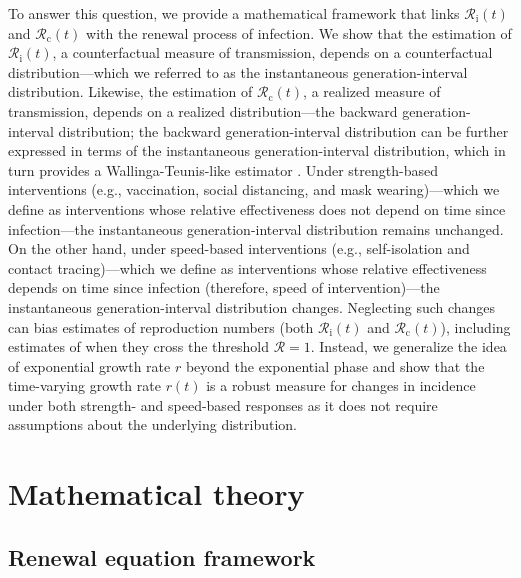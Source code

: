 \documentclass[12pt]{article}
\newcommand{\Rx}[1]{\ensuremath{{\mathcal R}_{#1}}\xspace}
\newcommand{\Rc}{\Rx{\mathrm{c}}}
\newcommand{\Ri}{\Rx{\mathrm{i}}}
\newcommand{\RR}{\ensuremath{{\mathcal R}}\xspace}
\begin{document}
To answer this question, we provide a mathematical framework that links $\Ri(t)$ and $\Rc(t)$ with the renewal process of infection.
We show that the estimation of $\Ri(t)$, a counterfactual measure of transmission, depends on a counterfactual distribution---which we referred to as the instantaneous generation-interval distribution.
Likewise, the estimation of $\Rc(t)$, a realized measure of transmission, depends on a realized distribution---the backward generation-interval distribution;
the backward generation-interval distribution can be further expressed in terms of the instantaneous generation-interval distribution, which in turn provides a Wallinga-Teunis-like estimator \citep{wallinga2004different}.
Under strength-based interventions (e.g., vaccination, social distancing, and mask wearing)---which we define as interventions whose relative effectiveness does not depend on time since infection---the instantaneous generation-interval distribution remains unchanged.
On the other hand, under speed-based interventions (e.g., self-isolation and contact tracing)---which we define as interventions whose relative effectiveness depends on time since infection (therefore, speed of intervention)---the instantaneous generation-interval distribution changes.
Neglecting such changes can bias estimates of reproduction numbers (both $\Ri(t)$ and $\Rc(t)$), including estimates of when they cross the threshold $\RR=1$.
Instead, we generalize the idea of exponential growth rate $r$ beyond the exponential phase and show that the time-varying growth rate $r(t)$ is a robust measure for changes in incidence under both strength- and speed-based responses as it does not require assumptions about the underlying distribution.

\section{Mathematical theory}

\subsection{Renewal equation framework}
\end{document}

